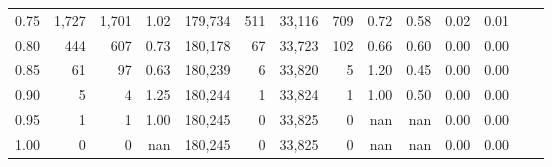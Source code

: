 \begin{tabular}{rrrrrrrrrrrrrr}
0.75 &   1,727 &  1,701 &    1.02 &  179,734 &      511 &  33,116 &     709 &  0.72 &  0.58 &  0.02 &      0.01 \\
0.80 &     444 &    607 &    0.73 &  180,178 &       67 &  33,723 &     102 &  0.66 &  0.60 &  0.00 &      0.00 \\
0.85 &      61 &     97 &    0.63 &  180,239 &        6 &  33,820 &       5 &  1.20 &  0.45 &  0.00 &      0.00 \\
0.90 &       5 &      4 &    1.25 &  180,244 &        1 &  33,824 &       1 &  1.00 &  0.50 &  0.00 &      0.00 \\
0.95 &       1 &      1 &    1.00 &  180,245 &        0 &  33,825 &       0 &   nan &   nan &  0.00 &      0.00 \\
1.00 &       0 &      0 &     nan &  180,245 &        0 &  33,825 &       0 &   nan &   nan &  0.00 &      0.00 \\
\bottomrule
\end{tabular}
